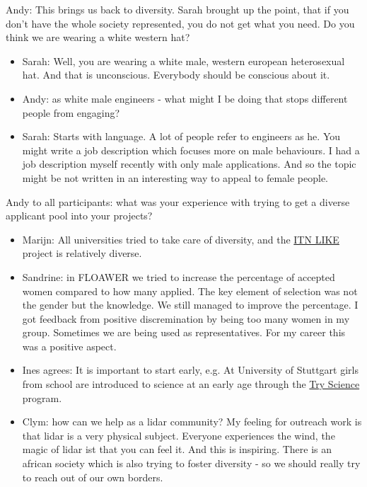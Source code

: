 Andy: This brings us back to diversity. Sarah brought up the point, that if you don't have the whole society represented, you do not get what you need. Do you think we are wearing a white western hat?

\begin{itemize}
	\item Sarah: Well, you are wearing a white male, western european heterosexual hat. And that is unconscious. Everybody should be conscious about it.
	\item Andy: as white male engineers - what might I be doing that stops different people from engaging?
	\item Sarah: Starts with language. A lot of people refer to engineers as he. You might write a job description which focuses more on male behaviours. I had a job description myself recently with only male applications. And so the topic might be not written in an interesting way to appeal to female people.
\end{itemize}

Andy to all participants: what was your experience with trying to get a diverse applicant pool into your projects?

\begin{itemize}
	\item Marijn: All universities tried to take care of diversity, and the \href{https://www.msca-like.eu/}{ITN LIKE} project is relatively diverse.
	\item Sandrine: in FLOAWER we tried to increase the percentage of accepted women compared to how many applied. The key element of selection was not the gender but the knowledge. We still managed to improve the percentage. I got feedback from positive discremination by being too many women in my group. Sometimes we are being used as representatives. For my career this was a positive aspect.
	\item Ines agrees: It is important to start early, e.g. At University of Stuttgart girls from school are introduced to science at an early age through the \href{}{Try Science} program.
	\item Clym: how can we help as a lidar community? My feeling for outreach work is that lidar is a very physical subject. Everyone experiences the wind, the magic of lidar ist that you can feel it. And this is inspiring. There is an african society which is also trying to foster diversity - so we should really try to reach out of our own borders.
\end{itemize}

